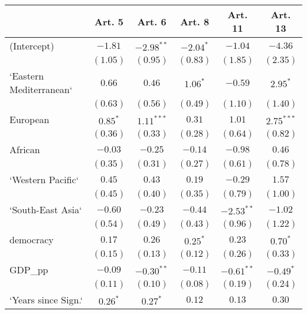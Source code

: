 
\begin{table}[!h]
\begin{center}
\begin{tabular}{l c c c c c }
\toprule
 & Art. 5 & Art. 6 & Art. 8 & Art. 11 & Art. 13 \\
\midrule
(Intercept)             & $-1.81$      & $-2.98^{**}$ & $-2.04^{*}$  & $-1.04$      & $-4.36$      \\
                        & $(1.05)$     & $(0.95)$     & $(0.83)$     & $(1.85)$     & $(2.35)$     \\
`Eastern Mediterranean` & $0.66$       & $0.46$       & $1.06^{*}$   & $-0.59$      & $2.95^{*}$   \\
                        & $(0.63)$     & $(0.56)$     & $(0.49)$     & $(1.10)$     & $(1.40)$     \\
European                & $0.85^{*}$   & $1.11^{***}$ & $0.31$       & $1.01$       & $2.75^{***}$ \\
                        & $(0.36)$     & $(0.33)$     & $(0.28)$     & $(0.64)$     & $(0.82)$     \\
African                 & $-0.03$      & $-0.25$      & $-0.14$      & $-0.98$      & $0.46$       \\
                        & $(0.35)$     & $(0.31)$     & $(0.27)$     & $(0.61)$     & $(0.78)$     \\
`Western Pacific`       & $0.45$       & $0.43$       & $0.19$       & $-0.29$      & $1.57$       \\
                        & $(0.45)$     & $(0.40)$     & $(0.35)$     & $(0.79)$     & $(1.00)$     \\
`South-East Asia`       & $-0.60$      & $-0.23$      & $-0.44$      & $-2.53^{**}$ & $-1.02$      \\
                        & $(0.54)$     & $(0.49)$     & $(0.43)$     & $(0.96)$     & $(1.22)$     \\
democracy               & $0.17$       & $0.26$       & $0.25^{*}$   & $0.23$       & $0.70^{*}$   \\
                        & $(0.15)$     & $(0.13)$     & $(0.12)$     & $(0.26)$     & $(0.33)$     \\
GDP\_pp                 & $-0.09$      & $-0.30^{**}$ & $-0.11$      & $-0.61^{**}$ & $-0.49^{*}$  \\
                        & $(0.11)$     & $(0.10)$     & $(0.08)$     & $(0.19)$     & $(0.24)$     \\
`Years since Sign.`     & $0.26^{*}$   & $0.27^{*}$   & $0.12$       & $0.13$       & $0.30$       \\

\end{tabular}
\end{center}
\end{table}
